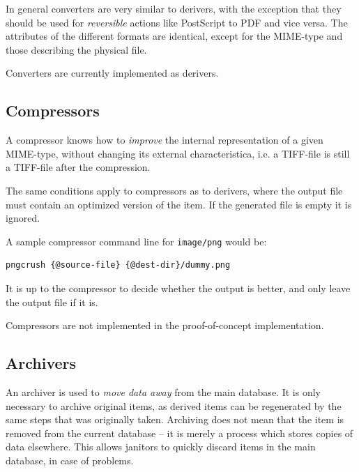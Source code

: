 In general converters are very similar to derivers, with the exception
that they should be used for \textit{reversible} actions like
PostScript to PDF and vice versa.   The attributes of the different
formats are identical, except for the MIME-type and those describing
the physical file.

Converters are currently implemented as derivers.

\subsection{Compressors}

A compressor knows how to \textit{improve} the internal representation
of a given MIME-type, without changing its external characteristica,
i.e. a TIFF-file is still a TIFF-file after the compression.

The same conditions apply to compressors as to derivers, where the
output file must contain an optimized version of the item.  If the
generated file is empty it is ignored.

A sample compressor command line for \texttt{image/png} would be:

\begin{verbatim}
pngcrush {@source-file} {@dest-dir}/dummy.png
\end{verbatim}

It is up to the compressor to decide whether the output is better, and
only leave the output file if it is.

Compressors are not implemented in the proof-of-concept
implementation.





\subsection{Archivers}

An archiver is used to \textit{move data away} from the main database.
It is only necessary to archive original items, as derived items can
be regenerated by the same steps that was originally taken.  Archiving
does not mean that the item is removed from the current database -- it
is merely a process which stores copies of data elsewhere.  This
allows janitors to quickly discard items in the main database, in case
of problems.


